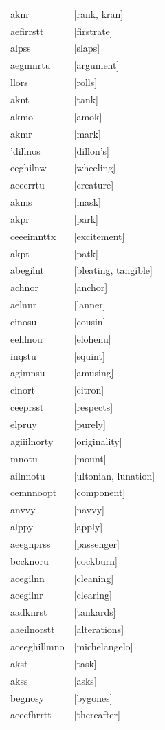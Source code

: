 \documentclass{article}
\begin{document}
\begin{tabular}{ll}
aknr & [rank, kran] \\
aefirrstt & [firstrate] \\
alpss & [slaps] \\
aegmnrtu & [argument] \\
llors & [rolls] \\
aknt & [tank] \\
akmo & [amok] \\
akmr & [mark] \\
'dillnos & [dillon's] \\
eeghilnw & [wheeling] \\
aceerrtu & [creature] \\
akms & [mask] \\
akpr & [park] \\
ceeeimnttx & [excitement] \\
akpt & [patk] \\
abegilnt & [bleating, tangible] \\
achnor & [anchor] \\
aelnnr & [lanner] \\
cinosu & [cousin] \\
eehlnou & [elohenu] \\
inqstu & [squint] \\
agimnsu & [amusing] \\
cinort & [citron] \\
ceeprsst & [respects] \\
elpruy & [purely] \\
agiiilnorty & [originality] \\
mnotu & [mount] \\
ailnnotu & [ultonian, lunation] \\
cemnnoopt & [component] \\
anvvy & [navvy] \\
alppy & [apply] \\
aeegnprss & [passenger] \\
bccknoru & [cockburn] \\
acegilnn & [cleaning] \\
acegilnr & [clearing] \\
aadknrst & [tankards] \\
aaeilnorstt & [alterations] \\
aceeghillmno & [michelangelo] \\
akst & [task] \\
akss & [asks] \\
begnosy & [bygones] \\
aeeefhrrtt & [thereafter] \\

\end{tabular}
\end{document}

